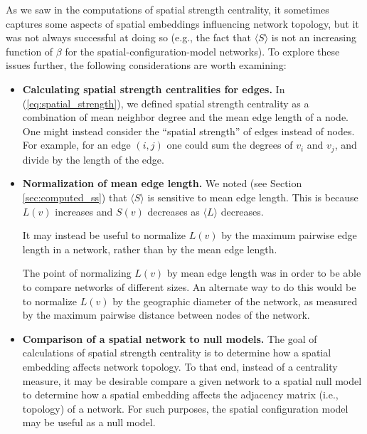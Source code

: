 \documentclass[%
 reprint,
 amsmath,amssymb,
 aps,
]{revtex4-1}
\begin{document}
As we saw in the computations of spatial strength centrality, it sometimes captures some aspects of spatial embeddings influencing network topology, but it was not always successful at doing so (e.g., the fact that $\langle S \rangle$ is not an increasing function of $\beta$ for the spatial-configuration-model networks). To explore these issues further, the following considerations are worth examining:
\begin{itemize}
    \item{\textbf{Calculating spatial strength centralities for edges.} In (\ref{eq:spatial_strength}), we defined spatial strength centrality as a combination of mean neighbor degree and the mean edge length of a node. One might instead consider the ``spatial strength'' of edges instead of nodes. {\color{red}For example, for an edge $(i, j)$ one could sum the degrees of $v_i$ and $v_j$, and divide by the length of the edge. }}
    \item{\textbf{Normalization of mean edge length.} We noted (see Section \ref{sec:computed_ss}) that $\langle S \rangle$ is sensitive to mean edge length. This is because $L(v)$ increases and $S(v)$ decreases as $\langle L \rangle$ decreases. 
     {\color{red}It may instead be useful to normalize $L(v)$ by the maximum pairwise edge length in a network, rather than by the mean edge length. 
     
     The point of normalizing $L(v)$ by mean edge length was in order to be able to compare networks of different sizes. An alternate way to do this would be to normalize $L(v)$ by the geographic diameter of the network, as measured by the maximum pairwise distance between nodes of the network.}}
    \item{\textbf{Comparison of a spatial network to null models.} The goal of calculations of spatial strength centrality is to determine how a spatial embedding affects network topology. To that end, instead of a centrality measure, it may be desirable compare a given network to a spatial null model to determine how a spatial embedding affects the adjacency matrix (i.e., topology) of a network. For such purposes, the spatial configuration model may be useful as a null model.}
\end{itemize}
\end{document}
